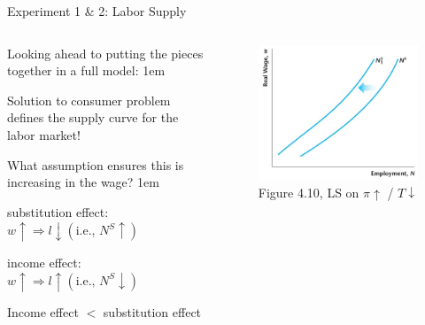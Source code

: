 \documentclass[11pt,aspectratio=43]{beamer}
\let\olditemize=\itemize
\let\endolditemize=\enditemize
\renewenvironment{itemize}{\olditemize \itemsep1em}{\endolditemize}
\theoremstyle{definition}
\begin{document}
\begin{frame}{Experiment 1 \& 2: Labor Supply}
\label{slide:Experiment_1____2__Labor_Supply}

    \begin{columns}
        \begin{column}{0.5\textwidth}
        Looking ahead to putting the pieces together in a full model:
        \begin{itemize}
            \item Solution to consumer problem defines the supply curve for the labor market!
            \item What assumption ensures this is increasing in the wage?
            \begin{itemize}
                \item substitution effect: $ w \uparrow \Rightarrow l \downarrow (\text{i.e., } N^{S} \uparrow ) $
                \item income effect: $ w \uparrow \Rightarrow l \uparrow  (\text{i.e., } N^{S} \downarrow ) $
                \item Income effect $ < $ substitution effect
            \end{itemize}
        \end{itemize}
        \end{column}
        \begin{column}{0.5\textwidth}
            \begin{figure}
                \caption{Figure 4.10, LS on $ \pi \uparrow $ / $ T \downarrow  $}
                \includegraphics[width=\textwidth]{./figures/Figure4_10.jpg}
            \end{figure}
        \end{column}
    \end{columns}
\end{frame}
\end{document}
